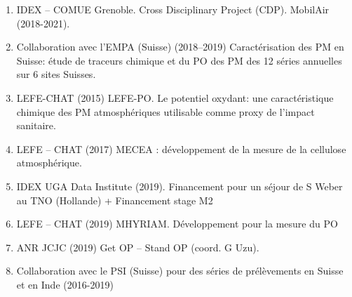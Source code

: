 \begin{enumerate}
    \item IDEX – COMUE Grenoble. Cross Disciplinary Project (CDP). MobilAir (2018-2021).
    \item Collaboration avec l’EMPA (Suisse) (2018--2019) Caractérisation des PM en
        Suisse: étude de traceurs chimique et du PO des PM des 12 séries annuelles sur 6
        sites Suisses.
    \item LEFE-CHAT (2015) LEFE-PO. Le potentiel oxydant: une caractéristique chimique des PM atmosphériques utilisable comme proxy de l’impact sanitaire. 
    \item LEFE – CHAT (2017) MECEA : développement de la mesure de la cellulose atmosphérique.
    \item IDEX UGA Data Institute (2019). Financement pour un séjour de S Weber au TNO (Hollande) + Financement stage M2
    \item LEFE – CHAT (2019) MHYRIAM. Développement pour la mesure du PO 
    \item ANR JCJC (2019) Get OP – Stand OP (coord. G Uzu). 
    \item Collaboration avec le PSI (Suisse) pour des séries de prélèvements en Suisse et en Inde (2016-2019)
\end{enumerate}

